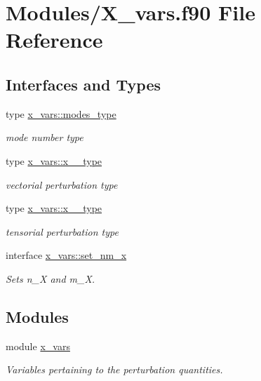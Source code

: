 \hypertarget{X__vars_8f90}{}\section{Modules/\+X\+\_\+vars.f90 File Reference}
\label{X__vars_8f90}
\subsection*{Interfaces and Types}
\begin{DoxyCompactItemize}
\item 
type \hyperlink{structx__vars_1_1modes__type}{x\+\_\+vars\+::modes\+\_\+type}
\begin{DoxyCompactList}\small\item\em mode number type \end{DoxyCompactList}\item 
type \hyperlink{structx__vars_1_1x__1__type}{x\+\_\+vars\+::x\+\_\+\_\+type}
\begin{DoxyCompactList}\small\item\em vectorial perturbation type \end{DoxyCompactList}\item 
type \hyperlink{structx__vars_1_1x__2__type}{x\+\_\+vars\+::x\+\_\+\_\+type}
\begin{DoxyCompactList}\small\item\em tensorial perturbation type \end{DoxyCompactList}\item 
interface \hyperlink{interfacex__vars_1_1set__nm__x}{x\+\_\+vars\+::set\+\_\+nm\+\_\+x}
\begin{DoxyCompactList}\small\item\em Sets {\ttfamily n\+\_\+X} and {\ttfamily m\+\_\+X}. \end{DoxyCompactList}\end{DoxyCompactItemize}
\subsection*{Modules}
\begin{DoxyCompactItemize}
\item 
module \hyperlink{namespacex__vars}{x\+\_\+vars}
\begin{DoxyCompactList}\small\item\em Variables pertaining to the perturbation quantities. \end{DoxyCompactList}\end{DoxyCompactItemize}
